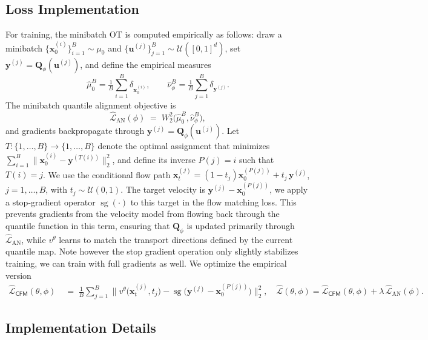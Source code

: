 \documentclass{article}
\theoremstyle{plain}
\theoremstyle{definition}
\theoremstyle{remark}
\begin{document}
 \subsection{Loss Implementation}\label{appendix:mini-batch}
For training, the minibatch OT is computed empirically as follows: draw a minibatch 
\(\{\mathbf x_0^{(i)}\}_{i=1}^B \sim \mu_0\) and 
\(\{\mathbf u^{(j)}\}_{j=1}^B \sim \mathcal U([0,1]^d)\), 
set \(\mathbf y^{(j)} = \mathbf Q_\phi(\mathbf u^{(j)})\), and define the empirical measures
\[
\hat\mu_0^B = \tfrac{1}{B}\sum_{i=1}^B \delta_{\mathbf x_0^{(i)}}, 
\qquad
\hat\nu_\phi^B = \tfrac{1}{B}\sum_{j=1}^B \delta_{\mathbf y^{(j)}}.
\]
The minibatch quantile alignment objective is
\[
\widehat{\mathcal L}_{\operatorname{AN}}(\phi)\;=\;W_2^2\big(\hat\mu_0^B, \hat\nu_\phi^B\big),
\]
and gradients backpropagate through \(\mathbf y^{(j)} = \mathbf Q_\phi(\mathbf u^{(j)})\).
Let \(T:\{1,\ldots,B\}\to\{1,\ldots,B\}\) denote the optimal assignment that minimizes \(\sum_{i=1}^B\|\mathbf x_0^{(i)}-\mathbf y^{(T(i))}\|_2^2\), and define its inverse \(P(j)=i\) such that \(T(i)=j\). 
We use the conditional flow path \(\mathbf x_t^{(j)}=(1-t_j)\mathbf x_0^{(P(j))}+t_j\,\mathbf y^{(j)}\), \(j=1,\dots, B\), with \(t_j\sim \mathcal U(0,1)\). {The target velocity is \(\mathbf y^{(j)}-\mathbf x_0^{(P(j))}\), we apply a stop-gradient operator \(\operatorname{sg}(\cdot)\) to this target in the flow matching loss. This prevents gradients from the velocity model from flowing back through the quantile function in this term, ensuring that \(\mathbf Q_\phi\) is updated primarily through \(\widehat{\mathcal{L}}_{\operatorname{AN}}\), while \(v^\theta\) learns to match the transport directions defined by the current quantile map. Note however the stop gradient operation only slightly stabilizes training, we can train with full gradients as well.}
We optimize the empirical version
\begin{align}
{\widehat{\mathcal L}_{\mathsf{CFM}}(\theta,\phi)} &{\;=\;\frac1B\sum_{j=1}^B 
\big\|v^\theta\big(\mathbf x_t^{(j)},t_j\big)-\operatorname{sg}\big(\mathbf y^{(j)}-\mathbf x_0^{(P(j))}\big)\big\|_2^2}, \quad \nonumber \widehat{\mathcal L}(\theta,\phi)=\widehat{\mathcal L}_{\mathsf{CFM}}(\theta,\phi)+\lambda\,\widehat{\mathcal L}_{\operatorname{AN}}(\phi).
\end{align}

\subsection{Implementation Details}
\end{document}
